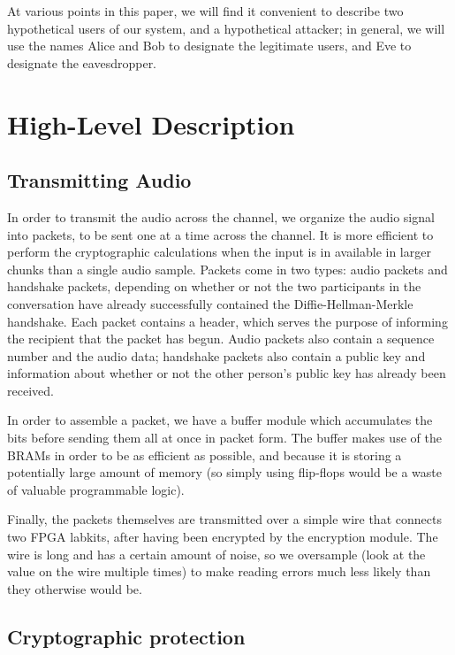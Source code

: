 \documentclass[a4paper]{report}
\begin{document}
At various points in this paper, we will %
find it convenient to describe two hypothetical users of our system, and a hypothetical attacker; in general, we will %
use the names Alice and Bob to designate the legitimate users, and Eve to designate the eavesdropper.

\chapter{High-Level Description}

\section{Transmitting Audio}

In order to transmit the audio across the channel, we organize the audio
signal into packets, to be sent one at a time across the channel. It is more
efficient to perform the cryptographic calculations when the input is in
available in larger chunks than a single audio sample. Packets come in two types: audio packets and handshake packets, depending on whether or not the two participants in the conversation have already successfully contained the Diffie-Hellman-Merkle handshake. Each packet
contains a header, which serves the purpose of informing the recipient that the packet has begun. Audio packets also contain a sequence number and the audio data; handshake packets also contain a public key and information about whether or not the other person's public key has already been received. 

In order to assemble a packet, we have a buffer module which 
accumulates the bits before sending them all at once in packet form. The buffer
makes use of the BRAMs in order to be as efficient as possible, and because
it is storing a potentially large amount of memory (so simply using
flip-flops would be a waste of valuable programmable logic).

Finally, the packets themselves are transmitted over a simple wire that
connects two FPGA labkits, after having been encrypted by the encryption module.
The wire is long and has a certain amount of noise, so we oversample (look at the value on the wire multiple times) to make reading errors much less likely than they otherwise would be.

\section{Cryptographic protection}
\end{document}

